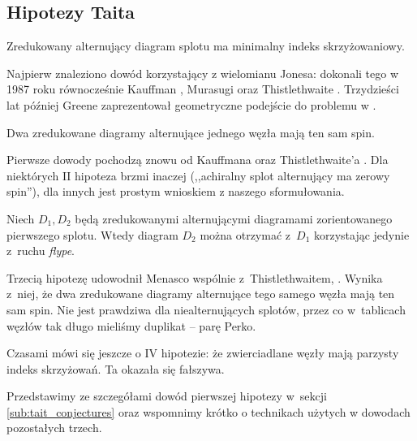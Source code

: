 
\subsection{Hipotezy Taita}

\begin{conjecture}
%
\label{con:tait_1}%
    Zredukowany alternujący diagram splotu ma minimalny indeks skrzyżowaniowy.
\end{conjecture}

Najpierw znaleziono dowód korzystający z wielomianu Jonesa: dokonali tego w 1987 roku równocześnie Kauffman \cite{kauffman87}, Murasugi \cite{murasugi87} oraz Thistlethwaite \cite{thistlethwaite87}.
%
%
%
Trzydzieści lat później Greene zaprezentował geometryczne podejście do problemu w \cite{greene17}.
%

\begin{conjecture}
%
    Dwa zredukowane diagramy alternujące jednego węzła mają ten sam spin.
\end{conjecture}

Pierwsze dowody pochodzą znowu od Kauffmana \cite{kauffman87} oraz Thistlethwaite'a \cite{thistlethwaite87}.
%
%
Dla niektórych II hipoteza brzmi inaczej (,,achiralny splot alternujący ma zerowy spin''), dla innych jest prostym wnioskiem z naszego sformułowania.

\begin{conjecture}
%
    Niech $D_1, D_2$ będą zredukowanymi alternującymi diagramami zorientowanego pierwszego splotu.
    Wtedy diagram $D_2$ można otrzymać z~$D_1$ korzystając jedynie z~ruchu \emph{flype}.
\end{conjecture}

Trzecią hipotezę udowodnił Menasco wspólnie z~Thistlethwaitem, \cite{menasco93}.
%
%
Wynika z~niej, że dwa zredukowane diagramy alternujące tego samego węzła mają ten sam spin.
Nie jest prawdziwa dla niealternujących splotów, przez co w~tablicach węzłów tak długo mieliśmy duplikat -- parę Perko.
%

Czasami mówi się jeszcze o IV hipotezie: że zwierciadlane węzły mają parzysty indeks skrzyżowań.
Ta okazała się fałszywa.

Przedstawimy ze szczegółami dowód pierwszej hipotezy w~sekcji \ref{sub:tait_conjectures} oraz wspomnimy krótko o technikach użytych w dowodach pozostałych trzech.




